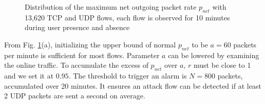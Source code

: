 \begin{figure}[tb]
\centering {}
\vspace*{-3mm}
\caption{Distribution of the maximum net outgoing
packet rate $p_{net}$ with 13,620 TCP and UDP flows, each flow is
observed for 10 minutes during user presence and absence}
\label{fig:ddos}
\end{figure}

From Fig. \ref{fig:ddos}(a), initializing the upper bound of normal
$p_{net}$ to be $a=60$ packets per minute is sufficient for most
flows. Parameter $a$ can be lowered by examining the online traffic. To
accumulate the excess of $p_{net}$ over $a$, $r$ must be close to 1
and we set it at $0.95$. The threshold to trigger an alarm is
$N=800$ packets, accumulated over 20 minutes. It ensures an attack
flow can be detected if at least 2 UDP packets are sent a second on
average.

